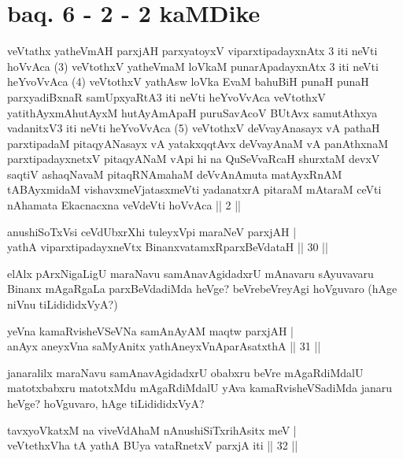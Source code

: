 \section*{baq. 6 - 2 - 2 kaMDike}

\begin{shl}
veVtathx yatheVmAH parxjAH parxyatoyxV viparxtipadayxnAtx 3 iti neVti hoVvAca (3) veVtothxV yatheVmaM loVkaM punarApadayxnAtx 3 iti neVti heYvoVvAca (4) veVtothxV yathAsw loVka EvaM bahuBiH punaH punaH parxyadiBxnaR samUpxyaRtA3 iti neVti heYvoVvAca veVtothxV yatithAyxmAhutAyxM hutAyAmApaH puruSavAcoV BUtAvx samutAthxya vadanitxV3 iti neVti heYvoVvAca (5) veVtothxV deVvayAnasayx vA pathaH parxtipadaM pitaqyANasayx vA yatakxqqtAvx deVvayAnaM vA panAthxnaM parxtipadayxnetxV pitaqyANaM vApi hi na QuSeVvaRcaH shurxtaM devxV saqtiV ashaqNavaM pitaqRNAmahaM deVvAnAmuta matAyxRnAM tABAyxmidaM vishavxmeVjatasxmeVti yadanatxrA pitaraM mAtaraM ceVti nAhamata Ekacnacxna veVdeVti hoVvAca || 2 ||
\end{shl}


\begin{shl}
anushiSoTxV\s si ceVdUbxrXhi tuleyxV\s pi maraNeV parxjAH | \\
yathA viparxtipadayxneVtx BinanxvatamxRparxBeVdataH \hfill|| 30 || 
\end{shl}

\begin{artha}
elAlx pArxNigaLigU maraNavu samAnavAgidadxrU mAnavaru sAyuvavaru 
Binanx mAgaRgaLa parxBeVdadiMda heVge? beVrebeVreyAgi hoVguvaro (hAge 
niVnu tiLidididxVyA?)
\end{artha}


\begin{shl}
yeVna kamaRvisheVSeVNa samAnAyAM maqtw parxjAH | \\
anAyx aneyxVna saMyAnitx yathA\s neyxVnAparAsatxthA \hfill|| 31 || 
\end{shl}

\begin{artha}
janaralilx maraNavu samAnavAgidadxrU obabxru beVre mAgaRdiMdalU 
matotxbabxru matotxMdu mAgaRdiMdalU yAva kamaRvisheVSadiMda janaru 
heVge? hoVguvaro, hAge tiLidididxVyA?
\end{artha}


\begin{shl}
tavxyoVkatxM na viveVdAhaM nAnushiSiTxrihAsitx meV | \\
veVtethxVha tA yathA BUya vataRnetxV parxjA iti  \hfill|| 32 || 
\end{shl}

